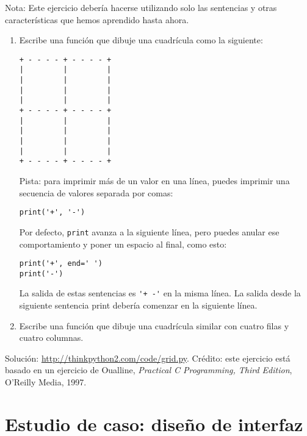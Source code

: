 \documentclass[10pt]{book}
\begin{document}
\begin{exercise}

Nota: Este ejercicio debería hacerse
utilizando solo las sentencias y otras características que hemos aprendido hasta
ahora.

\begin{enumerate}

\item Escribe una función que dibuje una cuadrícula como la siguiente:
\newpage
\begin{verbatim}
+ - - - - + - - - - +
|         |         |
|         |         |
|         |         |
|         |         |
+ - - - - + - - - - +
|         |         |
|         |         |
|         |         |
|         |         |
+ - - - - + - - - - +
\end{verbatim}
%
Pista: para imprimir más de un valor en una línea, puedes imprimir
una secuencia de valores separada por comas:

\begin{verbatim}
print('+', '-')
\end{verbatim}
%
Por defecto, {\tt print} avanza a la siguiente línea, pero
puedes anular ese comportamiento y poner un espacio al final, como esto:

\begin{verbatim}
print('+', end=' ')
print('-')
\end{verbatim}
%
La salida de estas sentencias es \verb"'+ -'" en la misma línea.
La salida desde la siguiente sentencia print debería comenzar en la siguiente línea.

\item Escribe una función que dibuje una cuadrícula similar
con cuatro filas y cuatro columnas.

\end{enumerate}

Solución: \url{http://thinkpython2.com/code/grid.py}.
Crédito: este ejercicio está basado en un ejercicio de Oualline, {\em
    Practical C Programming, Third Edition}, O'Reilly Media, 1997.

\end{exercise}





\chapter{Estudio de caso: diseño de interfaz}
\label{turtlechap}
\end{document}
